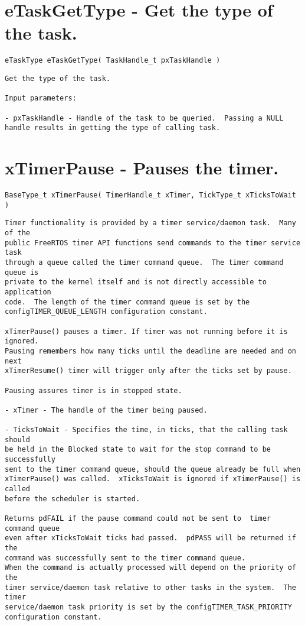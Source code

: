\section{eTaskGetType -  Get the type of the task.}
\label{rt_cmd:eTaskGetType}
\begin{verbatim}
eTaskType eTaskGetType( TaskHandle_t pxTaskHandle )
\end{verbatim}
\begin{lstlisting}
Get the type of the task.

Input parameters:

- pxTaskHandle - Handle of the task to be queried.  Passing a NULL
handle results in getting the type of calling task.

\end{lstlisting}

\section{xTimerPause -  Pauses the timer.}
\label{rt_cmd:xTimerPause}

\begin{verbatim}
BaseType_t xTimerPause( TimerHandle_t xTimer, TickType_t xTicksToWait )
\end{verbatim}

\begin{lstlisting}
Timer functionality is provided by a timer service/daemon task.  Many of the
public FreeRTOS timer API functions send commands to the timer service task
through a queue called the timer command queue.  The timer command queue is
private to the kernel itself and is not directly accessible to application
code.  The length of the timer command queue is set by the
configTIMER_QUEUE_LENGTH configuration constant.

xTimerPause() pauses a timer. If timer was not running before it is ignored.
Pausing remembers how many ticks until the deadline are needed and on next
xTimerResume() timer will trigger only after the ticks set by pause.

Pausing assures timer is in stopped state.
 
- xTimer - The handle of the timer being paused.

- TicksToWait - Specifies the time, in ticks, that the calling task should
be held in the Blocked state to wait for the stop command to be successfully
sent to the timer command queue, should the queue already be full when
xTimerPause() was called.  xTicksToWait is ignored if xTimerPause() is called
before the scheduler is started.

Returns pdFAIL if the pause command could not be sent to  timer command queue
even after xTicksToWait ticks had passed.  pdPASS will be returned if the
command was successfully sent to the timer command queue.
When the command is actually processed will depend on the priority of the
timer service/daemon task relative to other tasks in the system.  The timer
service/daemon task priority is set by the configTIMER_TASK_PRIORITY
configuration constant.

\end{lstlisting}


